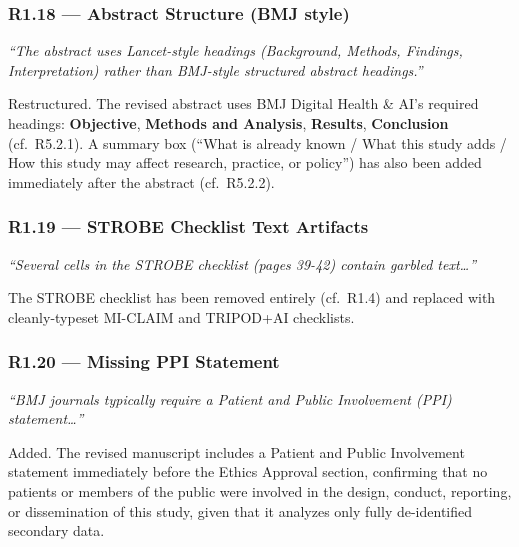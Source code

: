 \documentclass[11pt,letterpaper]{article}
\newcommand{\reviewer}[1]{\par\medskip\textcolor{blue!75!black}{\textit{#1}}\par\medskip}
\newcommand{\response}[1]{\par#1\par\medskip}
\begin{document}
\subsubsection*{R1.18 --- Abstract Structure (BMJ style)}
\reviewer{``The abstract uses Lancet-style headings (Background, Methods, Findings, Interpretation) rather than BMJ-style structured abstract headings.''}
\response{Restructured. The revised abstract uses BMJ Digital Health \& AI's required headings: \textbf{Objective}, \textbf{Methods and Analysis}, \textbf{Results}, \textbf{Conclusion} (cf.\ R5.2.1). A summary box (``What is already known / What this study adds / How this study may affect research, practice, or policy'') has also been added immediately after the abstract (cf.\ R5.2.2).}

\subsubsection*{R1.19 --- STROBE Checklist Text Artifacts}
\reviewer{``Several cells in the STROBE checklist (pages 39-42) contain garbled text\dots''}
\response{The STROBE checklist has been removed entirely (cf.\ R1.4) and replaced with cleanly-typeset MI-CLAIM and TRIPOD+AI checklists.}

\subsubsection*{R1.20 --- Missing PPI Statement}
\reviewer{``BMJ journals typically require a Patient and Public Involvement (PPI) statement\dots''}
\response{Added. The revised manuscript includes a Patient and Public Involvement statement immediately before the Ethics Approval section, confirming that no patients or members of the public were involved in the design, conduct, reporting, or dissemination of this study, given that it analyzes only fully de-identified secondary data.}
\end{document}
